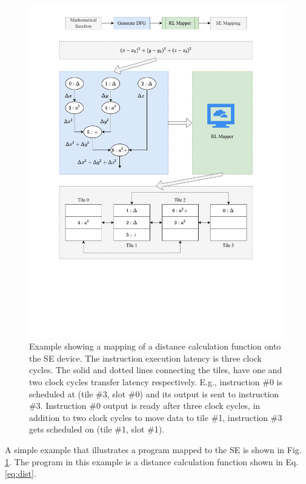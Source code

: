 \begin{figure}
  \centering
  \includegraphics[trim=70 180 70 25, clip, width=\linewidth]{fig/SE_example.pdf}
  \caption{
    Example showing a mapping of a distance calculation function onto the SE device.
    The instruction execution latency is three clock cycles.
    The solid and dotted lines connecting the tiles, have one and two clock cycles transfer latency respectively.
    E.g., instruction \#0 is scheduled at (tile \#3, slot \#0) and its output is sent to instruction \#3.
    Instruction \#0 output is ready after three clock cycles, in addition to two clock cycles to move data to tile \#1, instruction \#3 gets scheduled on (tile \#1, slot \#1).
  }
  \label{fig:se_example}
\end{figure}

A simple example that illustrates a program mapped to the SE is shown in Fig. \ref{fig:se_example}.
The program in this example is a distance calculation function shown in Eq. \ref{eq:dist}.

